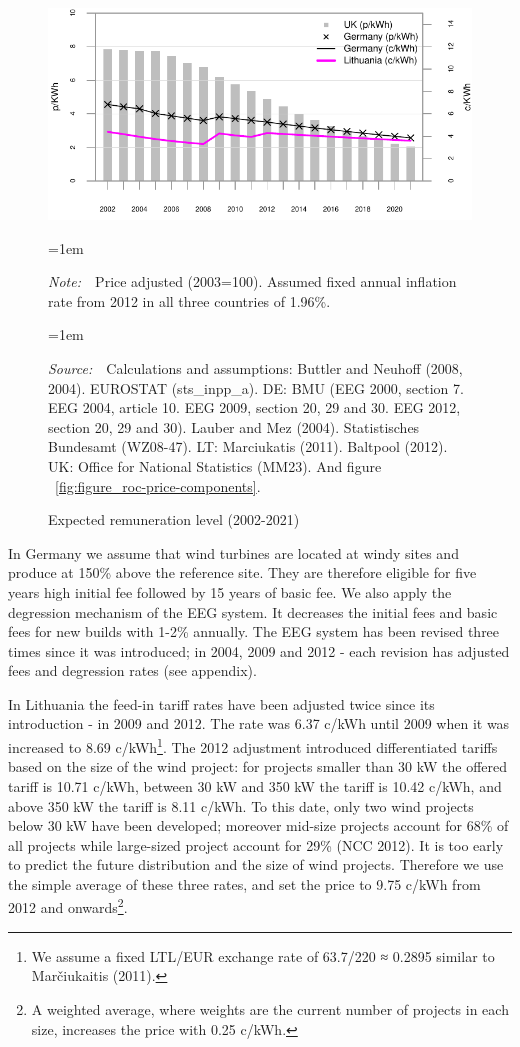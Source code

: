 \documentclass[a4paper, 12pt]{article}
\newcommand{\Figtext}[1]{%
	\begin{tablenotes}[para,flushleft]
		\hangindent=1em
		\footnotesize
		\raggedright
		#1
	\end{tablenotes}
}
\newcommand{\Fignote}[1]{\Figtext{\emph{Note:~}~#1}}
\newcommand{\Figsource}[1]{\Figtext{\emph{Source:~}~#1}}
\begin{document}
\begin{figure}
	\centering
	\caption{Expected remuneration level (2002-2021)}
	\includegraphics[width=1\textwidth]{fig_expected-average-remuneration-priceadjusted}
	\Fignote{Price adjusted (2003=100). Assumed fixed annual inflation rate from 2012 in all three countries of 1.96\%.}
	\Figsource{Calculations and assumptions: Buttler and Neuhoff (2008, 2004). EUROSTAT (sts\_inpp\_a). DE: BMU (EEG 2000, section 7. EEG 2004, article 10. EEG 2009, section 20, 29 and 30. EEG 2012, section 20, 29 and 30). Lauber and Mez (2004). Statistisches Bundesamt (WZ08-47). LT: Marciukatis (2011). Baltpool (2012). UK: Office for National Statistics (MM23). And figure ~\ref{fig:figure_roc-price-components}.}
	\label{fig:fig_expected-average-remuneration-priceadjusted}
\end{figure}

In Germany we assume that wind turbines are located at windy sites and produce at 150\% above the reference site. They are therefore eligible for five years high initial fee followed by 15 years of basic fee. We also apply the degression mechanism of the EEG system. It decreases the initial fees and basic fees for new builds with 1-2\% annually. The EEG system has been revised three times since it was introduced; in 2004, 2009 and 2012 - each revision has adjusted fees and degression rates (see appendix).

In Lithuania the feed-in tariff rates have been adjusted twice since its introduction - in 2009 and 2012. The rate was 6.37 c/kWh until 2009 when it was increased to 8.69 c/kWh\footnote{We assume a fixed LTL/EUR exchange rate of 63.7/220 ≈ 0.2895 similar to Marčiukaitis (2011).}. The 2012 adjustment introduced differentiated tariffs based on the size of the wind project: for projects smaller than 30 kW the offered tariff is 10.71 c/kWh, between 30 kW and 350 kW the tariff is 10.42 c/kWh, and above 350 kW the tariff is 8.11 c/kWh. To this date, only two wind projects below 30 kW have been developed; moreover mid-size projects account for 68\% of all projects while large-sized project account for 29\% (NCC 2012). It is too early to predict the future distribution and the size of wind projects. Therefore we use the simple average of these three rates, and set the price to 9.75 c/kWh from 2012 and onwards\footnote{A weighted average, where weights are the current number of projects in each size, increases the price with 0.25 c/kWh.}. 
\end{document}
